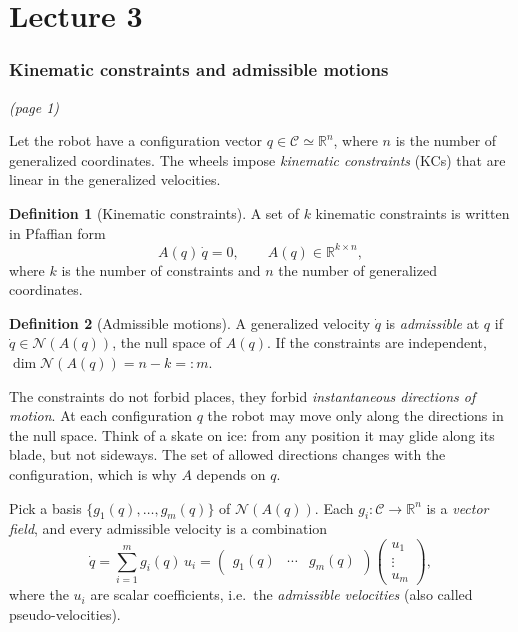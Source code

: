 \documentclass[11pt,a4paper]{article}
\newcommand{\R}{\mathbb{R}}
\newcommand{\N}{\mathcal{N}}
\newcommand{\dq}{\dot q}
\theoremstyle{definition}
\newtheorem{definition}{Definition}[section]
\theoremstyle{plain}
\theoremstyle{remark}
\begin{document}
\newpage

\setcounter{section}{0}
\renewcommand{\thesection}{\arabic{section}}
\part{Lecture 3}

\section{Kinematic constraints and admissible motions}\emph{(page 1)}

Let the robot have a configuration vector $q\in\mathcal{C}\simeq\R^n$, where $n$ is the number of generalized coordinates. The wheels impose \emph{kinematic constraints} (KCs) that are linear in the generalized velocities.

\begin{definition}[Kinematic constraints]
A set of $k$ kinematic constraints is written in Pfaffian form
\[
A(q)\,\dq = 0, \qquad A(q)\in\R^{k\times n},
\]
where $k$ is the number of constraints and $n$ the number of generalized coordinates.
\end{definition}

\begin{definition}[Admissible motions]
A generalized velocity $\dq$ is \emph{admissible} at $q$ if $\dq\in\N(A(q))$, the null space of $A(q)$. If the constraints are independent, $\dim\N(A(q))=n-k=:m$.
\end{definition}

\begin{intuition}
The constraints do not forbid places, they forbid \emph{instantaneous directions of motion}. At each configuration $q$ the robot may move only along the directions in the null space. Think of a skate on ice: from any position it may glide along its blade, but not sideways. The set of allowed directions changes with the configuration, which is why $A$ depends on $q$.
\end{intuition}

Pick a basis $\{g_1(q),\dots,g_m(q)\}$ of $\N(A(q))$. Each $g_i:\mathcal{C}\to\R^n$ is a \emph{vector field}, and every admissible velocity is a combination
\[
\dq=\sum_{i=1}^{m} g_i(q)\,u_i = \begin{pmatrix} g_1(q) & \cdots & g_m(q)\end{pmatrix}\begin{pmatrix}u_1\\ \vdots\\ u_m\end{pmatrix},
\]
where the $u_i$ are scalar coefficients, i.e.\ the \emph{admissible velocities} (also called pseudo-velocities).
\end{document}
